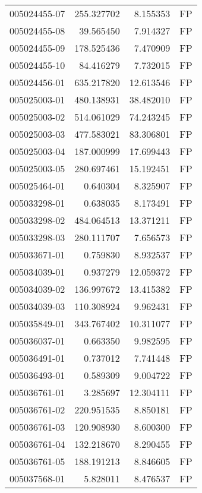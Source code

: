 \begin{tabular}{lrrl}
005024455-07 &  255.327702 &       8.155353 &   FP \\
005024455-08 &   39.565450 &       7.914327 &   FP \\
005024455-09 &  178.525436 &       7.470909 &   FP \\
005024455-10 &   84.416279 &       7.732015 &   FP \\
005024456-01 &  635.217820 &      12.613546 &   FP \\
005025003-01 &  480.138931 &      38.482010 &   FP \\
005025003-02 &  514.061029 &      74.243245 &   FP \\
005025003-03 &  477.583021 &      83.306801 &   FP \\
005025003-04 &  187.000999 &      17.699443 &   FP \\
005025003-05 &  280.697461 &      15.192451 &   FP \\
005025464-01 &    0.640304 &       8.325907 &   FP \\
005033298-01 &    0.638035 &       8.173491 &   FP \\
005033298-02 &  484.064513 &      13.371211 &   FP \\
005033298-03 &  280.111707 &       7.656573 &   FP \\
005033671-01 &    0.759830 &       8.932537 &   FP \\
005034039-01 &    0.937279 &      12.059372 &   FP \\
005034039-02 &  136.997672 &      13.415382 &   FP \\
005034039-03 &  110.308924 &       9.962431 &   FP \\
005035849-01 &  343.767402 &      10.311077 &   FP \\
005036037-01 &    0.663350 &       9.982595 &   FP \\
005036491-01 &    0.737012 &       7.741448 &   FP \\
005036493-01 &    0.589309 &       9.004722 &   FP \\
005036761-01 &    3.285697 &      12.304111 &   FP \\
005036761-02 &  220.951535 &       8.850181 &   FP \\
005036761-03 &  120.908930 &       8.600300 &   FP \\
005036761-04 &  132.218670 &       8.290455 &   FP \\
005036761-05 &  188.191213 &       8.846605 &   FP \\
005037568-01 &    5.828011 &       8.476537 &   FP \\

\end{tabular}
